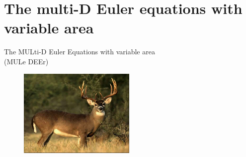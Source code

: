 \documentclass[xcolor=dvipsnames,10pt]{beamer}
\begin{document}
\section{The multi-D Euler equations with variable area}
\begin{frame}
\begin{center}
The MULti-D Euler Equations with variable area \\
(MULe DEEr)
\end{center}
\begin{figure}[H]
\centering
\includegraphics[width=0.5\textwidth]{../figures/Mule_Deer.png}
\end{figure}
\end{frame}
\end{document}
